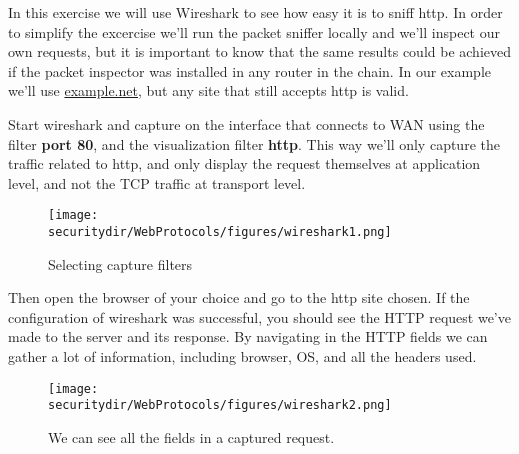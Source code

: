 \begin{Exercise}[label={webprotocols-http-practs}]
In this exercise we will use Wireshark to see how easy it is to sniff http. In order to simplify the excercise we'll run the packet sniffer locally and we'll inspect our own requests, but it is important to know that the same results could be achieved if the packet inspector was installed in any router in the chain. In our example we'll use \url{example.net}, but any site that still accepts http  is valid.


Start wireshark and capture on the interface that connects to WAN using the filter \textbf{port 80}, and the visualization filter \textbf{http}. This way we'll only capture the traffic related to http, and only display the request themselves at application level, and not the TCP traffic at transport level.
\begin{figure}[htb]
	\begin{centering}
		\texttt{[image: \\securitydir/WebProtocols/figures/wireshark1.png]}
		\par
	\end{centering}
	\caption{\label{fig:wireshark1} Selecting capture filters}
\end{figure}

Then open the browser of your choice and go to the http site chosen. If the configuration of wireshark was successful, you should see the HTTP request we've made to the server and its response. By navigating in the HTTP fields we can gather a lot of information, including browser, OS, and all the headers used.
\begin{figure}[htb]
	\begin{centering}
		\texttt{[image: \\securitydir/WebProtocols/figures/wireshark2.png]}
		\par\end{centering}
	\caption{\label{fig:wireshark1} We can see all the fields in a captured request.}
\end{figure}


\end{Exercise}
